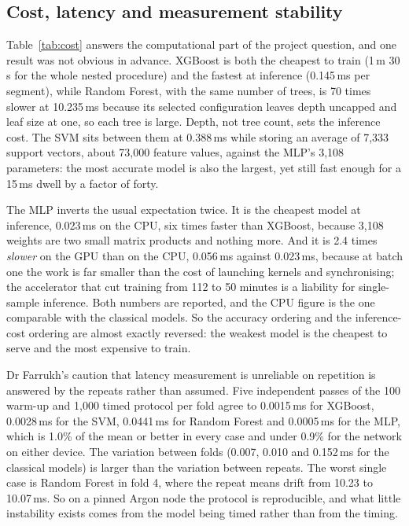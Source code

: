 \documentclass[conference]{IEEEtran}
\begin{document}
\subsection{Cost, latency and measurement stability}
Table~\ref{tab:cost} answers the computational part of the project question, and one result was not obvious in advance. XGBoost is both the cheapest to train (1\,m 30\,s for the whole nested procedure) and the fastest at inference (0.145\,ms per segment), while Random Forest, with the same number of trees, is 70 times slower at 10.235\,ms because its selected configuration leaves depth uncapped and leaf size at one, so each tree is large. Depth, not tree count, sets the inference cost. The SVM sits between them at 0.388\,ms while storing an average of 7,333 support vectors, about 73,000 feature values, against the MLP's 3,108 parameters: the most accurate model is also the largest, yet still fast enough for a 15\,ms dwell by a factor of forty.

The MLP inverts the usual expectation twice. It is the cheapest model at inference, 0.023\,ms on the CPU, six times faster than XGBoost, because 3,108 weights are two small matrix products and nothing more. And it is 2.4 times \emph{slower} on the GPU than on the CPU, 0.056\,ms against 0.023\,ms, because at batch one the work is far smaller than the cost of launching kernels and synchronising; the accelerator that cut training from 112 to 50 minutes is a liability for single-sample inference. Both numbers are reported, and the CPU figure is the one comparable with the classical models. So the accuracy ordering and the inference-cost ordering are almost exactly reversed: the weakest model is the cheapest to serve and the most expensive to train.

Dr Farrukh's caution that latency measurement is unreliable on repetition is answered by the repeats rather than assumed. Five independent passes of the 100 warm-up and 1,000 timed protocol per fold agree to 0.0015\,ms for XGBoost, 0.0028\,ms for the SVM, 0.0441\,ms for Random Forest and 0.0005\,ms for the MLP, which is 1.0\% of the mean or better in every case and under 0.9\% for the network on either device. The variation between folds (0.007, 0.010 and 0.152\,ms for the classical models) is larger than the variation between repeats. The worst single case is Random Forest in fold 4, where the repeat means drift from 10.23 to 10.07\,ms. So on a pinned Argon node the protocol is reproducible, and what little instability exists comes from the model being timed rather than from the timing.
\end{document}
